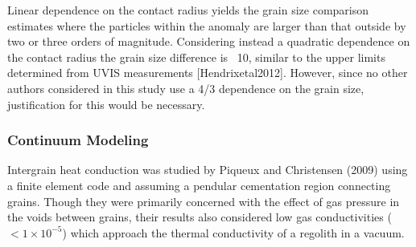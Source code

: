 \documentclass[11pt]{article} %
\begin{document}
	
	Linear dependence on the contact radius yields the grain size comparison estimates where the particles within the anomaly are larger than that outside by two or three orders of magnitude. Considering instead a quadratic dependence on the contact radius the grain size difference is ~10, similar to the upper limits determined from UVIS measurements [Hendrixetal2012]. However, since no other authors considered in this study use a 4/3 dependence on the grain size, justification for this would be necessary. %

\subsubsection{Continuum Modeling}
	 Intergrain heat conduction was studied by Piqueux and Christensen (2009) using a finite element code and assuming a pendular cementation region connecting grains. Though they were primarily concerned with the effect of gas pressure in the voids between grains, their results also considered low gas conductivities ($<1 \times10^{-5}$) which approach the thermal conductivity of a regolith in a vacuum.
	
\end{document}
